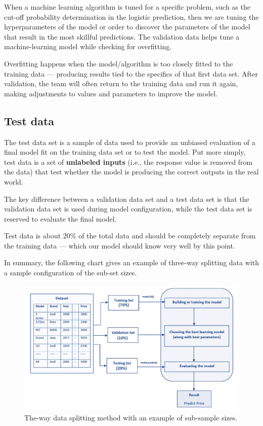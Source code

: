 \documentclass[
]{book}
\begin{document}
When a machine learning algorithm is tuned for a specific problem, such as the cut-off probability determination in the logistic prediction, then we are tuning the hyperparameters of the model or order to discover the parameters of the model that result in the most skillful predictions. The validation data helps tune a machine-learning model while checking for overfitting.

Overfitting happens when the model/algorithm is too closely fitted to the training data --- producing results tied to the specifics of that first data set. After validation, the team will often return to the training data and run it again, making adjustments to values and parameters to improve the model.

\hypertarget{test-data}{%
\subsection{Test data}\label{test-data}}

The test data set is a sample of data used to provide an unbiased evaluation of a final model fit on the training data set or to test the model. Put more simply, test data is a set of \textbf{unlabeled inputs} (i.e., the response value is removed from the data) that test whether the model is producing the correct outputs in the real world.

The key difference between a validation data set and a test data set is that the validation data set is used during model configuration, while the test data set is reserved to evaluate the final model.

Test data is about 20\% of the total data and should be completely separate from the training data --- which our model should know very well by this point.

In summary, the following chart gives an example of three-way splitting data with a sample configuration of the sub-set sizes.

\begin{figure}

{\centering \includegraphics[width=0.8\linewidth]{img06/w06-ThreeWaySplittingSize} 

}

\caption{The-way data splitting method with an example of sub-sample sizes.}\label{fig:unnamed-chunk-119}
\end{figure}
\end{document}
